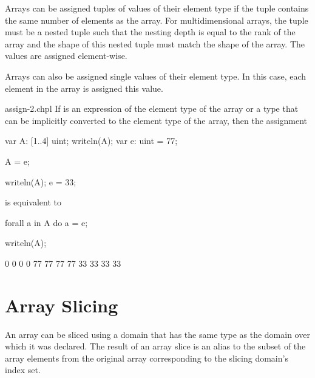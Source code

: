 Arrays can be assigned tuples of values of their element type if the
tuple contains the same number of elements as the array.  For
multidimensional arrays, the tuple must be a nested tuple such that
the nesting depth is equal to the rank of the array and the shape of
this nested tuple must match the shape of the array.  The values are
assigned element-wise.


Arrays can also be assigned single values of their element type.  In
this case, each element in the array is assigned this value.
\begin{chapelexample}{assign-2.chpl}
If  is an expression of the element type of the array or a
type that can be implicitly converted to the element type of the
array, then the assignment
\begin{chapelpre}
var A: [1..4] uint;
writeln(A);
var e: uint = 77;
\end{chapelpre}
\begin{chapel}
A = e;
\end{chapel}
\begin{chapelnoprint}
writeln(A);
e = 33;
\end{chapelnoprint}
is equivalent to
\begin{chapel}
forall a in A do
  a = e;
\end{chapel}
\begin{chapelpost}
writeln(A);
\end{chapelpost}
\begin{chapeloutput}
0 0 0 0
77 77 77 77
33 33 33 33
\end{chapeloutput}
\end{chapelexample}

\section{Array Slicing}
\label{Array_Slicing}

An array can be sliced using a domain that has the same type as the
domain over which it was declared.  The result of an array slice is an
alias to the subset of the array elements from the original array
corresponding to the slicing domain's index set.
 
